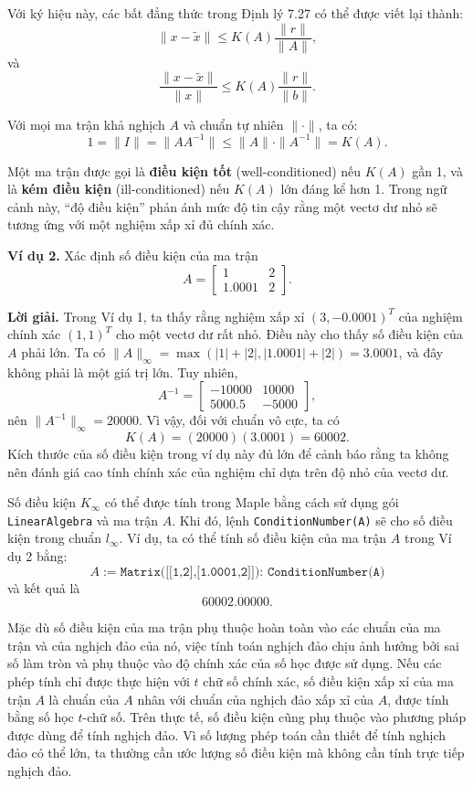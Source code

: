 Với ký hiệu này, các bất đẳng thức trong Định lý 7.27 có thể được viết lại thành:
\[
\|x - \tilde{x}\| \leq K(A) \frac{\|r\|}{\|A\|},
\]
và
\[
\frac{\|x - \tilde{x}\|}{\|x\|} \leq K(A) \frac{\|r\|}{\|b\|}.
\]

Với mọi ma trận khả nghịch \( A \) và chuẩn tự nhiên \( \|\cdot\| \), ta có:
\[
1 = \|I\| = \|A A^{-1}\| \leq \|A\| \cdot \|A^{-1}\| = K(A).
\]

Một ma trận được gọi là \textbf{điều kiện tốt} (well-conditioned) nếu \( K(A) \) gần 1, 
và là \textbf{kém điều kiện} (ill-conditioned) nếu \( K(A) \) lớn đáng kể hơn 1.  
Trong ngữ cảnh này, “độ điều kiện” phản ánh mức độ tin cậy rằng 
một vectơ dư nhỏ sẽ tương ứng với một nghiệm xấp xỉ đủ chính xác.

\textbf{Ví dụ 2.}  
Xác định số điều kiện của ma trận
\[
A = 
\begin{bmatrix}
1 & 2 \\
1.0001 & 2
\end{bmatrix}.
\]

\textbf{Lời giải.}  
Trong Ví dụ 1, ta thấy rằng nghiệm xấp xỉ \( (3, -0.0001)^T \) của nghiệm chính xác \( (1, 1)^T \) 
cho một vectơ dư rất nhỏ. Điều này cho thấy số điều kiện của \( A \) phải lớn.  
Ta có \( \|A\|_{\infty} = \max(|1| + |2|, |1.0001| + |2|) = 3.0001 \), 
và đây không phải là một giá trị lớn. Tuy nhiên,
\[
A^{-1} =
\begin{bmatrix}
-10000 & 10000 \\
5000.5 & -5000
\end{bmatrix},
\]
nên \( \|A^{-1}\|_{\infty} = 20000 \).  
Vì vậy, đối với chuẩn vô cực, ta có
\[
K(A) = (20000)(3.0001) = 60002.
\]
Kích thước của số điều kiện trong ví dụ này đủ lớn để cảnh báo rằng 
ta không nên đánh giá cao tính chính xác của nghiệm chỉ dựa trên độ nhỏ của vectơ dư.

Số điều kiện \( K_{\infty} \) có thể được tính trong Maple 
bằng cách sử dụng gói \texttt{LinearAlgebra} và ma trận \( A \).  
Khi đó, lệnh \texttt{ConditionNumber(A)} sẽ cho số điều kiện trong chuẩn \( l_{\infty} \).  
Ví dụ, ta có thể tính số điều kiện của ma trận \( A \) trong Ví dụ 2 bằng:
\[
A := \texttt{Matrix([[1,2],[1.0001,2]]): \ ConditionNumber(A)}
\]
và kết quả là
\[
60002.00000.
\]

Mặc dù số điều kiện của ma trận phụ thuộc hoàn toàn vào các chuẩn của ma trận và của nghịch đảo của nó, 
việc tính toán nghịch đảo chịu ảnh hưởng bởi sai số làm tròn và phụ thuộc vào độ chính xác của số học được sử dụng.  
Nếu các phép tính chỉ được thực hiện với \( t \) chữ số chính xác, 
số điều kiện xấp xỉ của ma trận \( A \) là chuẩn của \( A \) nhân với chuẩn của nghịch đảo xấp xỉ của \( A \), 
được tính bằng số học \( t \)-chữ số.  
Trên thực tế, số điều kiện cũng phụ thuộc vào phương pháp được dùng để tính nghịch đảo.  
Vì số lượng phép toán cần thiết để tính nghịch đảo có thể lớn, 
ta thường cần ước lượng số điều kiện mà không cần tính trực tiếp nghịch đảo.

